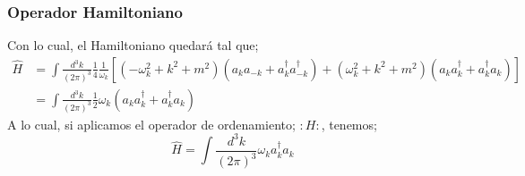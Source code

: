 \documentclass[../main.tex]{subfiles}
\begin{document}
\subsubsection{Operador Hamiltoniano}
Con lo cual, el Hamiltoniano quedará tal que;
\begin{align*}
  \hat{H} & = \int \frac{d^3k}{(2\pi)^3} \frac{1}{4} \frac{1}{\omega_k} \left[ \left( -\omega^2_k + k^2 + m^2 \right) \left( a_ka_{-k} + a^\dagger_k a^\dagger_{-k} \right) + \left( \omega_k^2 + k^2 + m^2 \right) \left( a_k a_k^\dagger + a^\dagger_{k}a_k \right) \right] \\
  & = \int \frac{d^3k}{(2\pi)^3} \frac{1}{2}\omega_k \left( a_ka_k^\dagger + a^\dagger_k a_k \right)
\end{align*}
A lo cual, si aplicamos el operador de ordenamiento; $:H:$, tenemos;
\begin{equation}
  \hat{H} = \int \frac{d^3k}{(2\pi)^3} \omega_k a^\dagger_k a_k
 \end{equation}
\end{document}
